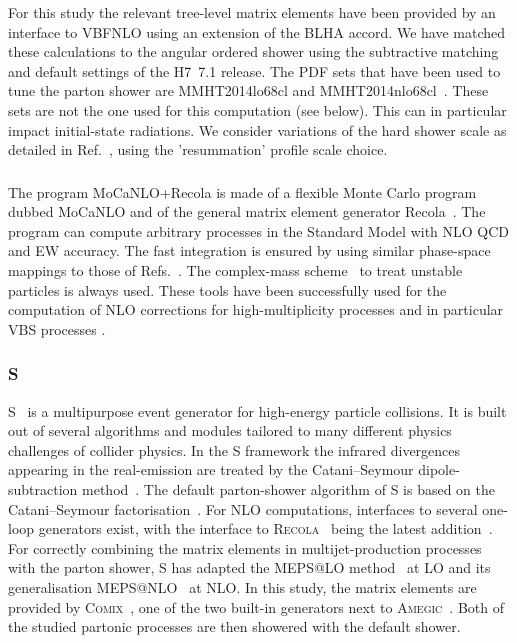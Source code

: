 \documentclass[11pt]{cernrep}
\newcommand{\Sherpa}{S\protect\scalebox{0.8}{HERPA}\xspace}
\newcommand{\Herwig}{H\protect\scalebox{0.8}{ERWIG}7\xspace}
\newcommand{\MoCaNLO}{M\protect\scalebox{0.8}{oCaNLO}\xspace}
\newcommand{\Recola}{R\protect\scalebox{0.8}{ecola}\xspace}
\begin{document}
For this study the relevant tree-level matrix elements have been
provided by an interface to VBFNLO \cite{Arnold:2008rz,Arnold:2011wj,Baglio:2014uba} using an extension of the BLHA
accord. We have matched these calculations to the angular ordered
shower using the subtractive matching and default settings of the
\Herwig~7.1 release. The PDF sets that have been used to tune the parton shower are MMHT2014lo68cl and
MMHT2014nlo68cl~\cite{Harland-Lang:2014zoa}.
These sets are not the one used for this computation (see below).
This can in particular impact initial-state radiations.
We consider variations of the hard shower scale as detailed in Ref.~\cite{Bellm:2016rhh}, using the 'resummation' profile scale choice.

\subsubsection*{\protect{\MoCaNLO\!+\Recola} \label{vbs_MoCaNLO_Recola}}

The program {\sc MoCaNLO+Recola} is made of a flexible Monte Carlo program dubbed {\sc MoCaNLO} and of the general matrix element generator {\sc Recola}~\cite{Actis:2012qn,Actis:2016mpe}.
The program can compute arbitrary processes in the Standard Model with NLO QCD and EW accuracy.
The fast integration is ensured by using similar phase-space mappings to those of Refs.~\cite{Berends:1994pv,Denner:1999gp,Dittmaier:2002ap}.
The complex-mass scheme~\cite{Denner:1999gp,Denner:2005fg} to treat unstable particles is always used.
These tools have been successfully used for the computation of NLO corrections for high-multiplicity processes and in particular VBS processes \cite{Biedermann:2016yds,Biedermann:2017bss}.

\subsubsection*{\protect\Sherpa \label{vbs_sherpa}}
\Sherpa~\cite{Gleisberg:2008ta,Gleisberg:2003xi} is a multipurpose event generator for high-energy particle collisions. 
It is built out of several algorithms and modules tailored to many different physics challenges of collider physics.
In the \Sherpa framework the infrared divergences appearing in the real-emission are treated by the Catani--Seymour dipole-subtraction method~\cite{Catani:1996vz,Catani:2002hc,Gleisberg:2007md}. 
The default parton-shower algorithm of \Sherpa is based on the Catani--Seymour factorisation~\cite{Schumann:2007mg,Hoeche:2009xc}.
For NLO computations, interfaces to several one-loop generators exist, with the interface to \textsc{Recola}~\cite{Actis:2012qn,Actis:2016mpe} being the latest addition~\cite{Biedermann:2017yoi}.
For correctly combining the matrix elements in multijet-production processes with the parton shower, \Sherpa has adapted the MEPS@LO method~\cite{Hoeche:2009rj} at LO and its generalisation MEPS@NLO~\cite{Hoche:2010kg} at NLO. 
In this study, the matrix elements are provided by \textsc{Comix}~\cite{Gleisberg:2008fv}, one of the two built-in generators next to \textsc{Amegic}~\cite{Krauss:2001iv}.
Both of the studied partonic processes are then showered with the default shower.
\end{document}
